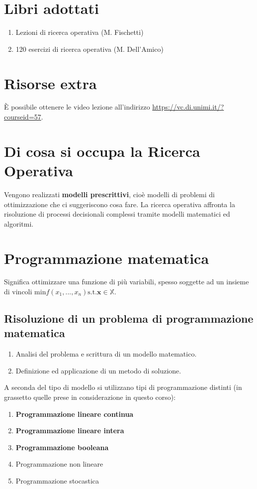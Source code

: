 \documentclass[\main/main.tex]{subfiles}
\begin{document}
\section{Libri adottati}
\begin{enumerate}
  \item Lezioni di ricerca operativa (M. Fischetti)
  \item 120 esercizi di ricerca operativa (M. Dell'Amico)
\end{enumerate}

\section{Risorse extra}
È possibile ottenere le video lezione all'indirizzo \url{https://vc.di.unimi.it/?courseid=57}.

\section{Di cosa si occupa la Ricerca Operativa}
Vengono realizzati \textbf{modelli prescrittivi}, cioè modelli di problemi di ottimizzazione che ci suggeriscono cosa fare. La ricerca operativa affronta la risoluzione di processi decisionali complessi tramite modelli matematici ed algoritmi.

\section{Programmazione matematica}
Significa ottimizzare una funzione di più variabili, spesso soggette ad un insieme di vincoli $\text{min} f(x_1,..., x_n) \text{s.t.} \bm{x} \in \mathbb{X}$.

\subsection{Risoluzione di un problema di programmazione matematica}

\begin{enumerate}
  \item Analisi del problema e scrittura di un modello matematico.
  \item Definizione ed applicazione di un metodo di soluzione.
\end{enumerate}

A seconda del tipo di modello si utilizzano tipi di programmazione distinti (in grassetto quelle prese in considerazione in questo corso):

\begin{enumerate}
  \item \textbf{Programmazione lineare continua}
  \item \textbf{Programmazione lineare intera}
  \item \textbf{Programmazione booleana}
  \item Programmazione non lineare
  \item Programmazione stocastica
\end{enumerate}
\end{document}

